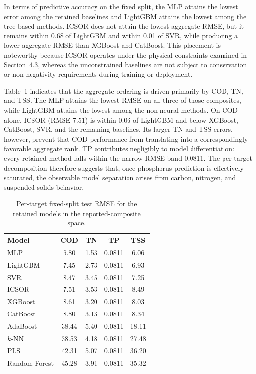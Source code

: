 \documentclass[a4paper,fleqn]{cas-sc}
\newenvironment{revblock}{\begingroup\color{revDefault}}{\endgroup}
\begin{document}
\begin{revblock}
In terms of predictive accuracy on the fixed split, the MLP attains the lowest error among the retained baselines and LightGBM attains the lowest among the tree-based methods. ICSOR does not attain the lowest aggregate RMSE, but it remains within 0.68 of LightGBM and within 0.01 of SVR, while producing a lower aggregate RMSE than XGBoost and CatBoost. This placement is noteworthy because ICSOR operates under the physical constraints examined in Section~4.3, whereas the unconstrained baselines are not subject to conservation or non-negativity requirements during training or deployment.

Table~\ref{tab:results_target_sample} indicates that the aggregate ordering is driven primarily by COD, TN, and TSS. The MLP attains the lowest RMSE on all three of those composites, while LightGBM attains the lowest among the non-neural methods. On COD alone, ICSOR (RMSE 7.51) is within 0.06 of LightGBM and below XGBoost, CatBoost, SVR, and the remaining baselines. Its larger TN and TSS errors, however, prevent that COD performance from translating into a correspondingly favorable aggregate rank. TP contributes negligibly to model differentiation: every retained method falls within the narrow RMSE band 0.0811. The per-target decomposition therefore suggests that, once phosphorus prediction is effectively saturated, the observable model separation arises from carbon, nitrogen, and suspended-solids behavior.

\begin{table}[htbp]
\centering
\caption{Per-target fixed-split test RMSE for the retained models in the reported-composite space.}
\label{tab:results_target_sample}
\scriptsize
\begin{tabular}{lcccc}
\hline
Model & COD & TN & TP & TSS \\
\hline
MLP & 6.80 & 1.53 & 0.0811 & 6.06 \\
LightGBM & 7.45 & 2.73 & 0.0811 & 6.93 \\
SVR & 8.47 & 3.45 & 0.0811 & 7.25 \\
ICSOR & 7.51 & 3.53 & 0.0811 & 8.49 \\
XGBoost & 8.61 & 3.20 & 0.0811 & 8.03 \\
CatBoost & 8.80 & 3.13 & 0.0811 & 8.34 \\
AdaBoost & 38.44 & 5.40 & 0.0811 & 18.11 \\
$k$-NN & 38.53 & 4.18 & 0.0811 & 27.48 \\
PLS & 42.31 & 5.07 & 0.0811 & 36.20 \\
Random Forest & 45.28 & 3.91 & 0.0811 & 35.32 \\
\hline
\end{tabular}
\end{table}


\end{revblock}
\end{document}
